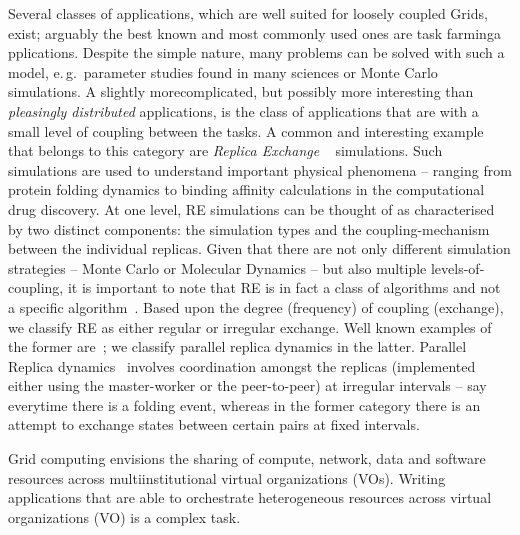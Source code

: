 \documentclass[times, 10pt,twocolumn]{article}
\begin{document}
\begin{abstract}
\end{abstract}

                           
Several classes of applications, which are well suited for loosely
coupled Grids, exist; arguably the best known and most commonly used
ones are task farminga pplications. Despite the simple nature, many
problems can be solved with such a model, e.\,g.\ parameter studies
found in many sciences or Monte Carlo simulations. A slightly
morecomplicated, but possibly more interesting than {\it pleasingly
  distributed} applications, is the class of applications that are
with a small level of coupling between the tasks.  
A common and interesting example that belongs to this category are
\emph{Replica Exchange }~\cite{hansmann,Sugita:1999rm} simulations.
Such simulations are used to understand important physical phenomena
-- ranging from protein folding dynamics to binding affinity
calculations in the computational drug discovery.  At one level, RE
simulations can be thought of as characterised by two distinct
components: the simulation types and the coupling-mechanism between
the individual replicas. Given that there are not only different
simulation strategies -- Monte Carlo or Molecular Dynamics -- but also
multiple levels-of-coupling, it is important to note that RE is in
fact a class of algorithms and not a specific
algorithm~\cite{dpa_surveypaper}.  Based upon the degree (frequency)
of coupling (exchange), we classify RE as either regular or irregular
exchange. Well known examples of the former
are~\cite{hansmann,Sugita:1999rm}; we classify parallel replica
dynamics in the latter. Parallel Replica dynamics~\cite{SPdynamics,
  pande_bj03} involves coordination amongst the replicas (implemented
either using the master-worker or the peer-to-peer) at irregular
intervals -- say everytime there is a folding event, whereas in the
former category there is an attempt to exchange states between certain
pairs at fixed intervals.

Grid computing envisions the sharing of compute, network, data and
software resources across multiinstitutional virtual organizations
(VOs). Writing applications that are able to orchestrate heterogeneous
resources across virtual organizations (VO) is a complex task.
\end{document}
